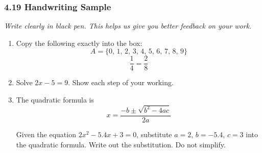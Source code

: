 \documentclass[12pt, twoside]{article}
\begin{document}
\subsubsection*{4.19 Handwriting Sample}
\emph{Write clearly in black pen. This helps us give you better feedback on your work.}

\begin{enumerate}[itemsep=0.4cm]

\item Copy the following exactly into the box:
$$A = \{0,\, 1,\, 2,\, 3,\, 4,\, 5,\, 6,\, 7,\, 8,\, 9\}$$
$$\frac{1}{4} = \frac{2}{8}$$


\item Solve $2x - 5 = 9$. Show each step of your working.


\item The quadratic formula is
$$x = \frac{-b \pm \sqrt{b^{2} - 4ac}}{2a}$$

Given the equation $2x^{2} - 5.4x + 3 = 0$, substitute $a = 2$, $b = -5.4$, $c = 3$ into the quadratic formula. Write out the substitution. Do not simplify.


\end{enumerate}
\end{document}
